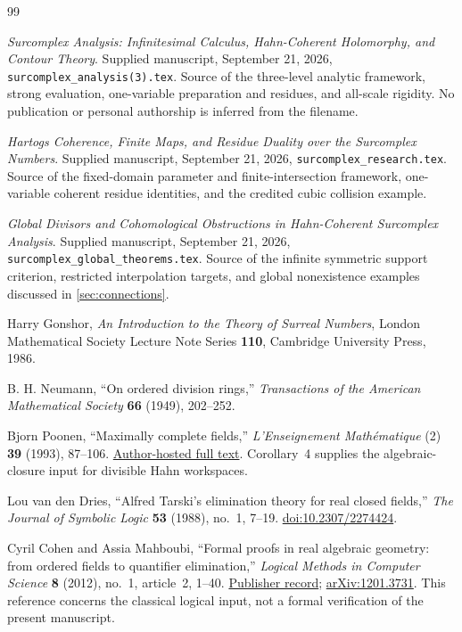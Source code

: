 \documentclass[11pt,letterpaper]{article}
\numberwithin{equation}{section}
\theoremstyle{definition}
\theoremstyle{remark}
\begin{document}
\begin{thebibliography}{99}
\small
{}
\emph{Surcomplex Analysis: Infinitesimal Calculus, Hahn-Coherent Holomorphy,
and Contour Theory}. Supplied manuscript, September 21, 2026,
\texttt{surcomplex\_analysis(3).tex}. Source of the three-level analytic
framework, strong evaluation, one-variable preparation and residues, and
all-scale rigidity. No publication or personal authorship is inferred
from the filename.

\emph{Hartogs Coherence, Finite Maps, and Residue Duality over the
Surcomplex Numbers}. Supplied manuscript, September 21, 2026,
\texttt{surcomplex\_research.tex}. Source of the fixed-domain parameter
and finite-intersection framework, one-variable coherent residue
identities, and the credited cubic collision example.

\emph{Global Divisors and Cohomological Obstructions in Hahn-Coherent
Surcomplex Analysis}. Supplied manuscript, September 21, 2026,
\texttt{surcomplex\_global\_theorems.tex}. Source of the infinite symmetric
support criterion, restricted interpolation targets, and global
nonexistence examples discussed in \cref{sec:connections}.

Harry Gonshor, \emph{An Introduction to the Theory of Surreal Numbers},
London Mathematical Society Lecture Note Series \textbf{110},
Cambridge University Press, 1986.

B. H. Neumann, ``On ordered division rings,''
\emph{Transactions of the American Mathematical Society}
\textbf{66} (1949), 202--252.

Bjorn Poonen, ``Maximally complete fields,''
\emph{L'Enseignement Math\'ematique} (2) \textbf{39} (1993), 87--106.
\href{https://math.mit.edu/~poonen/papers/amsval.pdf}{Author-hosted full text}.
Corollary~4 supplies the algebraic-closure input for divisible Hahn
workspaces.

Lou van den Dries, ``Alfred Tarski's elimination theory for real closed
fields,'' \emph{The Journal of Symbolic Logic} \textbf{53} (1988),
no.~1, 7--19.
\href{https://doi.org/10.2307/2274424}{doi:10.2307/2274424}.

Cyril Cohen and Assia Mahboubi,
``Formal proofs in real algebraic geometry: from ordered fields to
quantifier elimination,'' \emph{Logical Methods in Computer Science}
\textbf{8} (2012), no.~1, article~2, 1--40.
\href{https://lmcs.episciences.org/844}{Publisher record};
\href{https://arxiv.org/abs/1201.3731}{arXiv:1201.3731}.
This reference concerns the classical logical input, not a formal
verification of the present manuscript.


\end{thebibliography}
\end{document}
